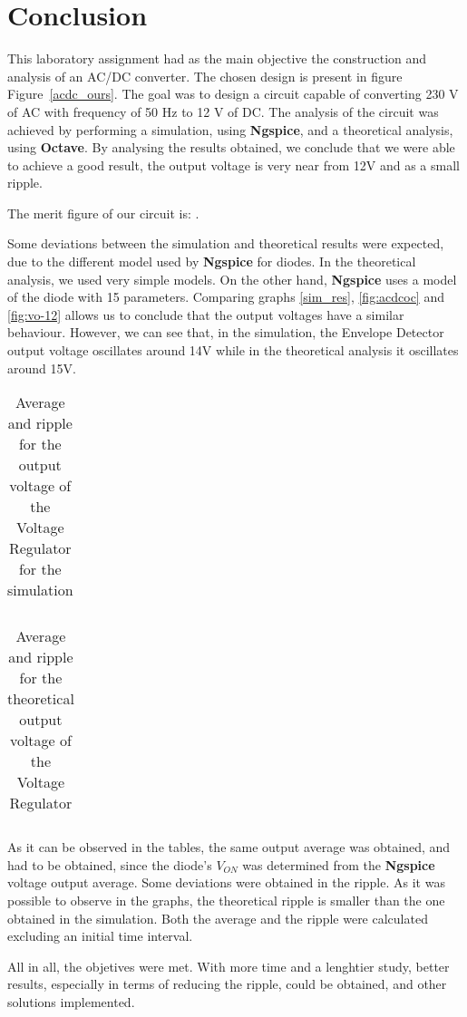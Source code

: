 \section{Conclusion}
\label{sec:conclusion}

This laboratory assignment had as the main objective the construction and analysis of an AC/DC converter. The chosen design is present in figure Figure~\ref{acdc_ours}. The goal was to design a circuit capable of converting 230 V of AC with frequency of 50 Hz to 12 V of DC. The analysis of the circuit was achieved by performing a simulation, using {\bf Ngspice}, and a theoretical analysis, using {\bf Octave}. By analysing the results obtained, we conclude that we were able to achieve a good result, the output voltage is very near from 12V and as a small ripple. 

The merit figure of our circuit is: .

Some deviations between the simulation and theoretical results were expected, due to the different model used by {\bf Ngspice} for diodes. In the theoretical analysis, we used very simple models. On the other hand, {\bf Ngspice} uses a model of the diode with 15 parameters. Comparing graphs \ref{sim_res}, \ref{fig:acdcoc} and \ref{fig:vo-12} allows us to conclude that the output voltages have a similar behaviour. However, we can see that, in the simulation, the Envelope Detector output voltage oscillates around 14V while in the theoretical analysis it oscillates around 15V. 

\begin{table}[H]
  \centering
  \begin{tabular}{|c|c|}
    \hline
        
        \hline
  \end{tabular}
  \caption{Average and ripple for the output voltage of the Voltage Regulator for the simulation}
  \label{tab:acdcsim}
\end{table}

\begin{table}[H]
  \centering
  \begin{tabular}{|c|c|}
    \hline
        
        \hline
  \end{tabular}
  \caption{Average and ripple for the theoretical output voltage of the Voltage Regulator}
  \label{tab:acdcoc}
\end{table}

As it can be observed in the tables, the same output average was obtained, and had to be obtained, since the diode's $V_{ON}$ was determined from the {\bf Ngspice} voltage output average. Some deviations were obtained in the ripple. As it was possible to observe in the graphs, the theoretical ripple is smaller than the one obtained in the simulation. Both the average and the ripple were calculated excluding an initial time interval.

All in all, the objetives were met. With more time and a lenghtier study, better results, especially in terms of reducing the ripple, could be obtained, and other solutions implemented.
